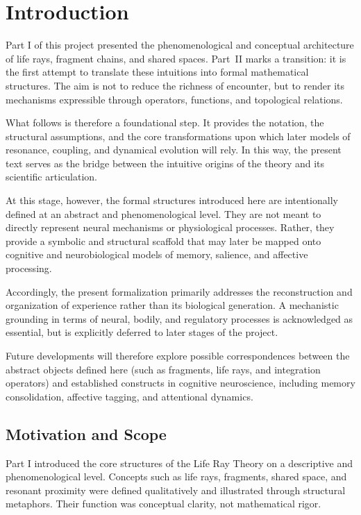 \documentclass[12pt,a4paper]{article}
\begin{document}
\section{Introduction}
Part I of this project presented the phenomenological and conceptual architecture of
life rays, fragment chains, and shared spaces. Part~II marks a transition: it is the first
attempt to translate these intuitions into formal mathematical structures. The aim is not
to reduce the richness of encounter, but to render its mechanisms expressible through
operators, functions, and topological relations.

What follows is therefore a foundational step. It provides the notation, the structural
assumptions, and the core transformations upon which later models of resonance,
coupling, and dynamical evolution will rely. In this way, the present text serves as the
bridge between the intuitive origins of the theory and its scientific articulation.

At this stage, however, the formal structures introduced here are intentionally defined at
an abstract and phenomenological level. They are not meant to directly represent neural
mechanisms or physiological processes. Rather, they provide a symbolic and structural
scaffold that may later be mapped onto cognitive and neurobiological models of memory,
salience, and affective processing.

Accordingly, the present formalization primarily addresses the reconstruction and
organization of experience rather than its biological generation. A mechanistic grounding
in terms of neural, bodily, and regulatory processes is acknowledged as essential, but is
explicitly deferred to later stages of the project.

Future developments will therefore explore possible correspondences between the abstract
objects defined here (such as fragments, life rays, and integration operators) and
established constructs in cognitive neuroscience, including memory consolidation,
affective tagging, and attentional dynamics.

\subsection{Motivation and Scope}
Part I introduced the core structures of the Life Ray Theory on a descriptive and
phenomenological level. Concepts such as life rays, fragments, shared space, and
resonant proximity were defined qualitatively and illustrated through structural
metaphors. Their function was conceptual clarity, not mathematical rigor.
\end{document}
